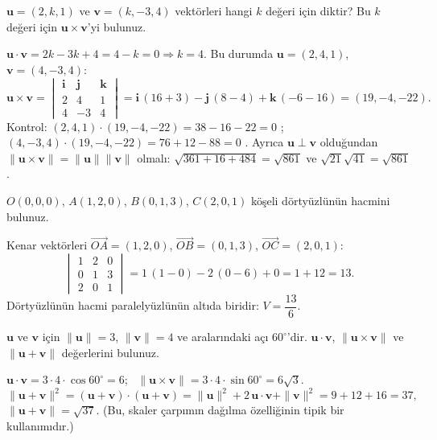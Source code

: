 \begin{soru}
$\mathbf u=(2,k,1)$ ve $\mathbf v=(k,-3,4)$ vektörleri hangi $k$ değeri için diktir? Bu $k$ değeri için $\mathbf u\times\mathbf v$'yi bulunuz.
\end{soru}
\begin{cevap}
$\mathbf u\cdot\mathbf v=2k-3k+4=4-k=0\Rightarrow k=4$. Bu durumda $\mathbf u=(2,4,1)$, $\mathbf v=(4,-3,4)$:
\[
\mathbf u\times\mathbf v=\begin{vmatrix}\mathbf i&\mathbf j&\mathbf k\\2&4&1\\4&-3&4\end{vmatrix}
=\mathbf i\,(16+3)-\mathbf j\,(8-4)+\mathbf k\,(-6-16)=(19,-4,-22).
\]
Kontrol: $(2,4,1)\cdot(19,-4,-22)=38-16-22=0$ \checkmark; $(4,-3,4)\cdot(19,-4,-22)=76+12-88=0$ \checkmark. Ayrıca $\mathbf u\perp\mathbf v$ olduğundan $\|\mathbf u\times\mathbf v\|=\|\mathbf u\|\|\mathbf v\|$ olmalı: $\sqrt{361+16+484}=\sqrt{861}$ ve $\sqrt{21}\sqrt{41}=\sqrt{861}$ \checkmark.
\end{cevap}

\begin{soru}
$O(0,0,0)$, $A(1,2,0)$, $B(0,1,3)$, $C(2,0,1)$ köşeli dörtyüzlünün hacmini bulunuz.
\end{soru}
\begin{cevap}
Kenar vektörleri $\overrightarrow{OA}=(1,2,0)$, $\overrightarrow{OB}=(0,1,3)$, $\overrightarrow{OC}=(2,0,1)$:
\[
\begin{vmatrix}1&2&0\\0&1&3\\2&0&1\end{vmatrix}=1\,(1-0)-2\,(0-6)+0=1+12=13 .
\]
Dörtyüzlünün hacmi paralelyüzlünün altıda biridir: $V=\dfrac{13}{6}$.
\end{cevap}

\begin{soru}
$\mathbf u$ ve $\mathbf v$ için $\|\mathbf u\|=3$, $\|\mathbf v\|=4$ ve aralarındaki açı $60^\circ$'dir. $\mathbf u\cdot\mathbf v$, $\|\mathbf u\times\mathbf v\|$ ve $\|\mathbf u+\mathbf v\|$ değerlerini bulunuz.
\end{soru}
\begin{cevap}
$\mathbf u\cdot\mathbf v=3\cdot4\cdot\cos60^\circ=6$; \ $\|\mathbf u\times\mathbf v\|=3\cdot4\cdot\sin60^\circ=6\sqrt3$.
\[
\|\mathbf u+\mathbf v\|^2=(\mathbf u+\mathbf v)\cdot(\mathbf u+\mathbf v)=\|\mathbf u\|^2+2\,\mathbf u\cdot\mathbf v+\|\mathbf v\|^2=9+12+16=37,
\]
$\|\mathbf u+\mathbf v\|=\sqrt{37}$. (Bu, skaler çarpımın dağılma özelliğinin tipik bir kullanımıdır.)
\end{cevap}

